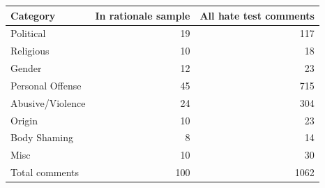 \begin{tabular}{lrr}
\toprule
Category & In rationale sample & All hate test comments \\
\midrule
Political & 19 & 117 \\
Religious & 10 & 18 \\
Gender & 12 & 23 \\
Personal Offense & 45 & 715 \\
Abusive/Violence & 24 & 304 \\
Origin & 10 & 23 \\
Body Shaming & 8 & 14 \\
Misc & 10 & 30 \\
Total comments & 100 & 1062 \\
\bottomrule
\end{tabular}
